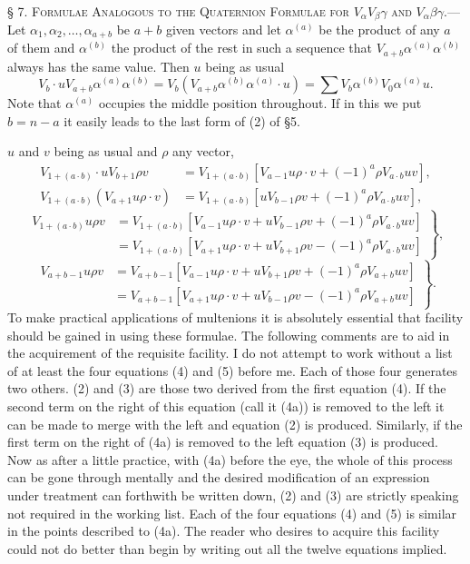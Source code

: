 \documentclass[11pt]{article}
\begin{document}
\noindent\textsc{§ 7. Formulae Analogous to the Quaternion Formulae for $V_\alpha V_\beta\gamma$ and $V_\alpha\beta\gamma$.}---Let $\alpha_1,\alpha_2,\ldots,\alpha_{a+b}$ be $a+b$ given vectors and let $\alpha^{(a)}$ be the product of any $a$ of them and $\alpha^{(b)}$ the product of the rest in such a sequence that $V_{a+b}\alpha^{(a)}\alpha^{(b)}$ always has the same value. Then $u$ being as usual
\begin{equation}V_b\cdot uV_{a+b}\alpha^{(a)}\alpha^{(b)}=V_b(V_{a+b}\alpha^{(b)}\alpha^{(a)}\cdot u)=\sum V_b\alpha^{(b)}V_0\alpha^{(a)}u.\tag{1}\end{equation}
Note that $\alpha^{(a)}$ occupies the middle position throughout. If in this we put $b=n-a$ it easily leads to the last form of (2) of §5.

$u$ and $v$ being as usual and $\rho$ any vector,
\begin{align}V_{1+(a\cdot b)}\cdot uV_{b+1}\rho v&=V_{1+(a\cdot b)}[V_{a-1}u\rho\cdot v+(-1)^a\rho V_{a\cdot b}uv],\tag{2}\\V_{1+(a\cdot b)}(V_{a+1}u\rho\cdot v)&=V_{1+(a\cdot b)}[uV_{b-1}\rho v+(-1)^a\rho V_{a\cdot b}uv],\tag{3}\end{align}
\begin{equation}\left.\begin{aligned}V_{1+(a\cdot b)}u\rho v&=V_{1+(a\cdot b)}[V_{a-1}u\rho\cdot v+uV_{b-1}\rho v+(-1)^a\rho V_{a\cdot b}uv]\\&=V_{1+(a\cdot b)}[V_{a+1}u\rho\cdot v+uV_{b+1}\rho v-(-1)^a\rho V_{a\cdot b}uv]\end{aligned}\right\},\tag{4}\end{equation}
\begin{equation}\left.\begin{aligned}V_{a+b-1}u\rho v&=V_{a+b-1}[V_{a-1}u\rho\cdot v+uV_{b+1}\rho v+(-1)^a\rho V_{a+b}uv]\\&=V_{a+b-1}[V_{a+1}u\rho\cdot v+uV_{b-1}\rho v-(-1)^a\rho V_{a+b}uv]\end{aligned}\right\}.\tag{5}\end{equation}
To make practical applications of multenions it is absolutely essential that facility should be gained in using these formulae. The following comments are to aid in the acquirement of the requisite facility. I do not attempt to work without a list of at least the four equations (4) and (5) before me. Each of those four generates two others. (2) and (3) are those two derived from the first equation (4). If the second term on the right of this equation (call it (4a)) is removed to the left it can be made to merge with the left and equation (2) is produced. Similarly, if the first term on the right of (4a) is removed to the left equation (3) is produced. Now as after a little practice, with (4a) before the eye, the whole of this process can be gone through mentally and the desired modification of an expression under treatment can forthwith be written down, (2) and (3) are strictly speaking not required in the working list. Each of the four equations (4) and (5) is similar in the points described to (4a). The reader who desires to acquire this facility could not do better than begin by writing out all the twelve equations implied.
\end{document}
